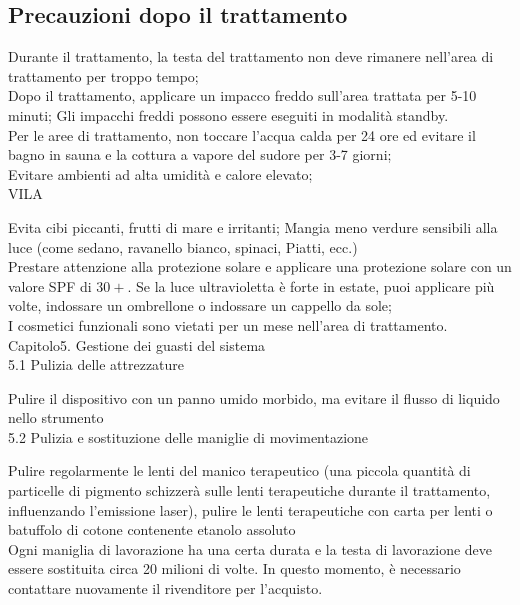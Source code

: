 \documentclass[10pt]{article}
\begin{document}
\subsection{Precauzioni dopo il trattamento}
Durante il trattamento, la testa del trattamento non deve rimanere nell'area di trattamento per troppo tempo;\\
Dopo il trattamento, applicare un impacco freddo sull'area trattata per 5-10 minuti; Gli impacchi freddi possono essere eseguiti in modalità standby.\\
Per le aree di trattamento, non toccare l'acqua calda per 24 ore ed evitare il bagno in sauna e la cottura a vapore del sudore per 3-7 giorni;\\
Evitare ambienti ad alta umidità e calore elevato;\\
VILA

Evita cibi piccanti, frutti di mare e irritanti; Mangia meno verdure sensibili alla luce (come sedano, ravanello bianco, spinaci, Piatti, ecc.)\\
Prestare attenzione alla protezione solare e applicare una protezione solare con un valore SPF di $30+$. Se la luce ultravioletta è forte in estate, puoi applicare più volte, indossare un ombrellone o indossare un cappello da sole;\\
I cosmetici funzionali sono vietati per un mese nell'area di trattamento.\\
Capitolo5. Gestione dei guasti del sistema\\
5.1 Pulizia delle attrezzature

Pulire il dispositivo con un panno umido morbido, ma evitare il flusso di liquido nello strumento\\
5.2 Pulizia e sostituzione delle maniglie di movimentazione

Pulire regolarmente le lenti del manico terapeutico (una piccola quantità di particelle di pigmento schizzerà sulle lenti terapeutiche durante il trattamento, influenzando l'emissione laser), pulire le lenti terapeutiche con carta per lenti o batuffolo di cotone contenente etanolo assoluto\\
Ogni maniglia di lavorazione ha una certa durata e la testa di lavorazione deve essere sostituita circa 20 milioni di volte. In questo momento, è necessario contattare nuovamente il rivenditore per l'acquisto.
\end{document}
